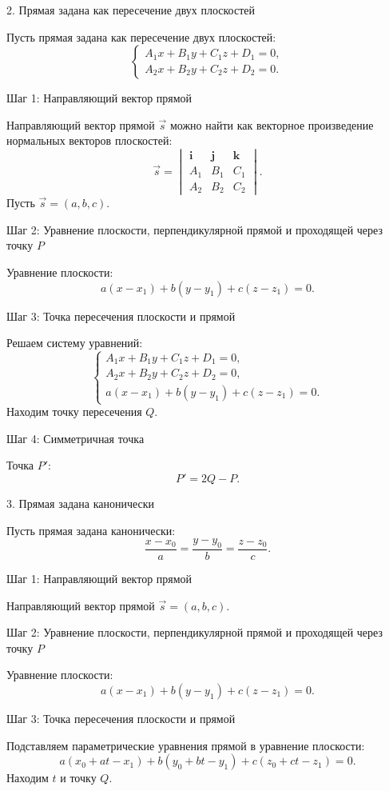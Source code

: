 \documentclass[a4paper,14pt]{extreport} %
\begin{document}
    2. Прямая задана как пересечение двух плоскостей

Пусть прямая задана как пересечение двух плоскостей:
\[
\begin{cases}
A_1x + B_1y + C_1z + D_1 = 0, \\
A_2x + B_2y + C_2z + D_2 = 0.
\end{cases}
\]

     Шаг 1: Направляющий вектор прямой

Направляющий вектор прямой \(\vec{s}\) можно найти как векторное произведение нормальных векторов плоскостей:
\[
\vec{s} = \begin{vmatrix}
\mathbf{i} & \mathbf{j} & \mathbf{k} \\
A_1 & B_1 & C_1 \\
A_2 & B_2 & C_2
\end{vmatrix}.
\]
Пусть \(\vec{s} = (a, b, c)\).

     Шаг 2: Уравнение плоскости, перпендикулярной прямой и проходящей через точку \(P\)

Уравнение плоскости:
\[
a(x - x_1) + b(y - y_1) + c(z - z_1) = 0.
\]

     Шаг 3: Точка пересечения плоскости и прямой

Решаем систему уравнений:
\[
\begin{cases}
A_1x + B_1y + C_1z + D_1 = 0, \\
A_2x + B_2y + C_2z + D_2 = 0, \\
a(x - x_1) + b(y - y_1) + c(z - z_1) = 0.
\end{cases}
\]
Находим точку пересечения \(Q\).

     Шаг 4: Симметричная точка

Точка \(P'\):
\[
P' = 2Q - P.
\]

    3. Прямая задана канонически

Пусть прямая задана канонически:
\[
\frac{x - x_0}{a} = \frac{y - y_0}{b} = \frac{z - z_0}{c}.
\]

     Шаг 1: Направляющий вектор прямой

Направляющий вектор прямой \(\vec{s} = (a, b, c)\).

     Шаг 2: Уравнение плоскости, перпендикулярной прямой и проходящей через точку \(P\)

Уравнение плоскости:
\[
a(x - x_1) + b(y - y_1) + c(z - z_1) = 0.
\]

     Шаг 3: Точка пересечения плоскости и прямой

Подставляем параметрические уравнения прямой в уравнение плоскости:
\[
a(x_0 + at - x_1) + b(y_0 + bt - y_1) + c(z_0 + ct - z_1) = 0.
\]
Находим \(t\) и точку \(Q\).
\end{document}
